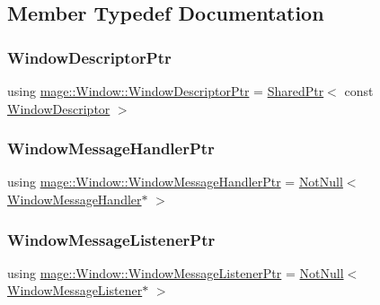 \subsection{Member Typedef Documentation}
\hypertarget{classmage_1_1_window_ac41b052d8e8dd0571b3ec862e8f6da05}{}\label{classmage_1_1_window_ac41b052d8e8dd0571b3ec862e8f6da05} 
\subsubsection{\texorpdfstring{Window\+Descriptor\+Ptr}{WindowDescriptorPtr}}
{\footnotesize\ttfamily using \hyperlink{classmage_1_1_window_ac41b052d8e8dd0571b3ec862e8f6da05}{mage\+::\+Window\+::\+Window\+Descriptor\+Ptr} =  \hyperlink{namespacemage_a1e01ae66713838a7a67d30e44c67703e}{Shared\+Ptr}$<$ const \hyperlink{classmage_1_1_window_descriptor}{Window\+Descriptor} $>$}

\hypertarget{classmage_1_1_window_add1d792fb9f71e70d4fb07409d80cfdd}{}\label{classmage_1_1_window_add1d792fb9f71e70d4fb07409d80cfdd} 
\subsubsection{\texorpdfstring{Window\+Message\+Handler\+Ptr}{WindowMessageHandlerPtr}}
{\footnotesize\ttfamily using \hyperlink{classmage_1_1_window_add1d792fb9f71e70d4fb07409d80cfdd}{mage\+::\+Window\+::\+Window\+Message\+Handler\+Ptr} =  \hyperlink{namespacemage_a8769f9d670d6b585ea306cb1062af94b}{Not\+Null}$<$ \hyperlink{classmage_1_1_window_message_handler}{Window\+Message\+Handler}$\ast$ $>$}

\hypertarget{classmage_1_1_window_a0e0a4f2a3f6db176f6aec454b94a06fb}{}\label{classmage_1_1_window_a0e0a4f2a3f6db176f6aec454b94a06fb} 
\subsubsection{\texorpdfstring{Window\+Message\+Listener\+Ptr}{WindowMessageListenerPtr}}
{\footnotesize\ttfamily using \hyperlink{classmage_1_1_window_a0e0a4f2a3f6db176f6aec454b94a06fb}{mage\+::\+Window\+::\+Window\+Message\+Listener\+Ptr} =  \hyperlink{namespacemage_a8769f9d670d6b585ea306cb1062af94b}{Not\+Null}$<$ \hyperlink{classmage_1_1_window_message_listener}{Window\+Message\+Listener}$\ast$ $>$}



